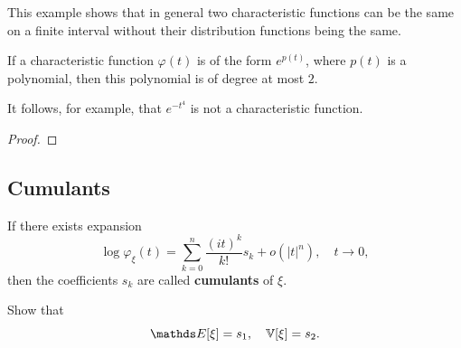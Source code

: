 This example shows that in general two characteristic functions can be the same on a finite interval without their distribution functions being
the same.

\begin{theorem}
If a characteristic function $\varphi(t)$ is of the form $e^{p(t)}$, where $p(t)$ is a polynomial, then this polynomial is of degree at most $2$.
\end{theorem}
It follows, for example, that $e^{-t^4}$ is not a characteristic function. 

\begin{proof}
\end{proof}

\subsection{Cumulants}
\begin{definition}
If there exists expansion 
\begin{equation*}
    \log \varphi_\xi(t) = \sum_{k=0}^n \frac{(it)^k}{k!} s_k + o(|t|^n), \quad t \to 0,
\end{equation*}
then the coefficients $s_k$ are called \textbf{cumulants} of $\xi$.
\end{definition}
\begin{exercise}
Show that 
\begin{equation*}
    \E[\xi] = s_1, \quad \V[\xi] = s_2.
\end{equation*}
\end{exercise}


